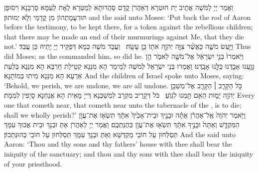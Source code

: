 {וַאֲמַר יְיָ לְמֹשֶׁה אֲתֵיב יָת חוּטְרָא דְּאַהֲרֹן קֳדָם סָהֲדוּתָא לְמַטְּרָא לְאָת לְעַמָּא סָרְבָנָא וִיסוּפָן תּוּרְעֲמָתְהוֹן מִן קֳדָמַי וְלָא יְמוּתוּן׃}
{and the \lord\space said unto Moses: ‘Put back the rod of Aaron before the testimony, to be kept there, for a token against the rebellious children; that there may be made an end of their murmurings against Me, that they die not.’}{}
{וַיַּ֖עַשׂ מֹשֶׁ֑ה כַּאֲשֶׁ֨ר צִוָּ֧ה יְהֹוָ֛ה אֹת֖וֹ כֵּ֥ן עָשָֽׂה׃ \petucha }
{וַעֲבַד מֹשֶׁה כְּמָא דְּפַקֵּיד יְיָ יָתֵיהּ כֵּן עֲבַד׃}
{Thus did Moses; as the \lord\space commanded him, so did he.}{}
{וַיֹּֽאמְרוּ֙ בְּנֵ֣י יִשְׂרָאֵ֔ל אֶל־מֹשֶׁ֖ה לֵאמֹ֑ר הֵ֥ן גָּוַ֛עְנוּ אָבַ֖דְנוּ כֻּלָּ֥נוּ אָבָֽדְנוּ׃}
{וַאֲמַרוּ בְּנֵי יִשְׂרָאֵל לְמֹשֶׁה לְמֵימַר הָא מִנַּנָא קְטֵילַת חַרְבָּא הָא מִנַּנָא בְּלַעַת אַרְעָא הָא מִנַּנָא מִיתוּ בְּמוֹתָנָא׃}
{And the children of Israel spoke unto Moses, saying: ‘Behold, we perish, we are undone, we are all undone.}{}
{כֹּ֣ל הַקָּרֵ֧ב \small ׀\normalsize  הַקָּרֵ֛ב אֶל־מִשְׁכַּ֥ן יְהֹוָ֖ה יָמ֑וּת הַאִ֥ם תַּ֖מְנוּ לִגְוֺֽעַ׃ \setuma 
{}}
{כֹּל דְּקָרֵיב מִקְרָב לְמַשְׁכְּנָא דַּייָ מָאִית הָא אֲנַחְנָא סָיְפִין לִמְמָת׃}
{Every one that cometh near, that cometh near unto the tabernacle of the \lord, is to die; shall we wholly perish?’}{}
\newperek
{}%
{וַיֹּ֤אמֶר יְהֹוָה֙ אֶֽל־אַהֲרֹ֔ן אַתָּ֗ה וּבָנֶ֤יךָ וּבֵית־אָבִ֙יךָ֙ אִתָּ֔ךְ תִּשְׂא֖וּ אֶת־עֲוֺ֣ן הַמִּקְדָּ֑שׁ וְאַתָּה֙ וּבָנֶ֣יךָ אִתָּ֔ךְ תִּשְׂא֖וּ אֶת־עֲוֺ֥ן כְּהֻנַּתְכֶֽם׃
}
{וַאֲמַר יְיָ לְאַהֲרֹן אַתְּ וּבְנָךְ וּבֵית אֲבוּךְ עִמָּךְ תְּסַלְּחוּן עַל חוֹבֵי מַקְדְּשָׁא וְאַתְּ וּבְנָךְ עִמָּךְ תְּסַלְּחוּן עַל חוֹבֵי כְּהוּנַּתְכוֹן׃}
{And the \lord\space said unto Aaron: ‘Thou and thy sons and thy fathers’  house with thee shall bear the iniquity of the sanctuary; and thou and thy sons with thee shall bear the iniquity of your priesthood.}{}
